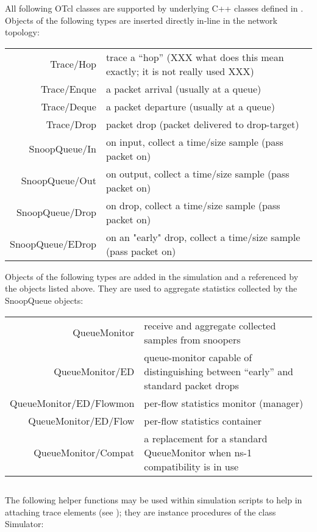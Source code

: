 All following OTcl classes are supported by underlying C++
classes defined in .
Objects of the following types are inserted directly in-line in the
network topology:

\begin{tabularx}{\linewidth}{rX}
Trace/Hop & trace a ``hop'' (XXX what does this mean exactly; it is not really used XXX) \\
Trace/Enque & a packet arrival (usually at a queue) \\
Trace/Deque & a packet departure (usually at a queue) \\
Trace/Drop & packet drop (packet delivered to drop-target) \\
SnoopQueue/In & on input, collect a time/size sample (pass packet on) \\
SnoopQueue/Out & on output, collect a time/size sample (pass packet on) \\
SnoopQueue/Drop & on drop, collect a time/size sample (pass packet on) \\
SnoopQueue/EDrop & on an "early" drop, collect a time/size sample (pass packet on) \\
\end{tabularx}

Objects of the following types are added in the simulation and a referenced
by the objects listed above.  They are used to aggregate statistics collected
by the SnoopQueue objects:

\begin{tabularx}{\linewidth}{rX}
QueueMonitor & receive and aggregate collected samples from snoopers \\
QueueMonitor/ED & queue-monitor capable of distinguishing between ``early'' and standard packet drops \\
QueueMonitor/ED/Flowmon & per-flow statistics monitor (manager) \\
QueueMonitor/ED/Flow & per-flow statistics container \\
QueueMonitor/Compat & a replacement for a standard QueueMonitor when ns-1 compatibility is in use \\
\end{tabularx}

\subsection{}

The following helper functions may be used within simulation
scripts to help in attaching trace elements (see );
they are instance procedures of the class Simulator:

